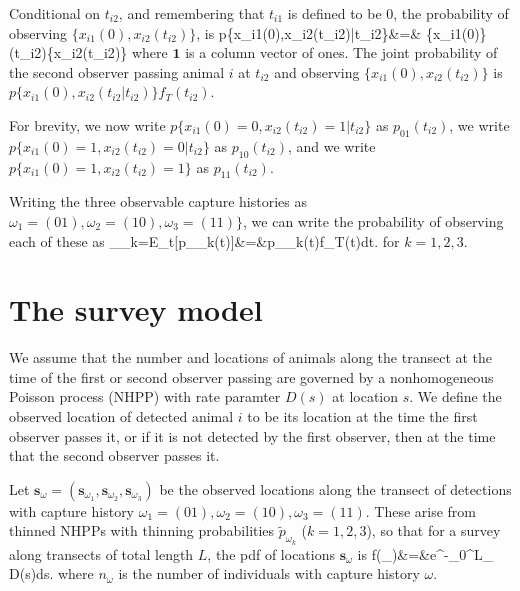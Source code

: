 \documentclass[useAMS, usenatbib, referee]{biom}\usepackage[]{graphicx}\usepackage[]{color}
\begin{document}
Conditional on $t_{i2}$, and remembering that $t_{i1}$ is defined to be 0, the probability of observing $\{x_{i1}(0),x_{i2}(t_{i2})\}$, is 
\be
p\{x_{i1}(0),x_{i2}(t_{i2})|t_{i2}\}&=&
\bm{\delta}\{x_{i1}(0)\}\bm{\Gamma}(t_{i2})\{x_{i2}(t_{i2})\}
\ee
\noindent
where $\bm{1}$ is a column vector of ones. The joint probability of the second observer passing animal $i$ at $t_{i2}$ and observing $\{x_{i1}(0),x_{i2}(t_{i2})\}$ is $p\{x_{i1}(0),x_{i2}(t_{i2}|t_{i2})\}f_{T}(t_{i2})$. 

For brevity, we now write $p\{x_{i1}(0)=0,x_{i2}(t_{i2})=1|t_{i2}\}$ as $p_{01}(t_{i2})$, we write $p\{x_{i1}(0)=1,x_{i2}(t_{i2})=0|t_{i2}\}$ as $p_{10}(t_{i2})$, and we write $p\{x_{i1}(0)=1,x_{i2}(t_{i2})=1\}$ as $p_{11}(t_{i2})$.

Writing the three observable capture histories as $\omega_1=(01), \omega_2=(10), \omega_3=(11)\}$, we can write the probability of observing each of these as
\be
{}_{\omega_k}=E_{t}[p_{\omega_k}(t)]&=&\displaystyle\int p_{\omega_k}(t)f_{T}(t)dt.
\ee
\noindent
for $k=1,2,3$.

\section{The survey model}

We assume that the number and locations of animals along the transect at the time of the first or second observer passing are governed by a nonhomogeneous Poisson process (NHPP) with rate paramter $D(s)$ at location $s$. We define the observed location of detected animal $i$ to be its location at the time the first observer passes it, or if it is not detected by the first observer, then at the time that the second observer passes it. 

Let $\bm{s}_{\omega}=(\bm{s}_{\omega_1},\bm{s}_{\omega_2},\bm{s}_{\omega_3})$ be the observed locations along the transect of detections with capture history $\omega_1=(01), \omega_2=(10), \omega_3=(11)$. These arise from thinned NHPPs with thinning probabilities $ \tilde{p}_{\omega_k}$ ($k=1,2,3$), so that for a survey along transects of total length $L$, the pdf of locations $\bm{s}_{\omega}$ is
\be
f(_{\omega})&=&\left[\prod_{i=1}^{n_{\omega}}\tilde{p}_{\omega} D(s_{\omega i})\right]e^{-\int_0^L_{\omega} D(s)ds}.
\label{eq:f(s_omega)}
\ee
\noindent
where $n_{\omega}$ is the number of individuals with capture history $\omega$.
\end{document}
